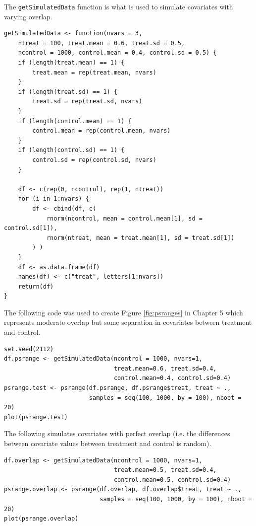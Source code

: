 \begin{singlespace}

\noindent The \texttt{getSimulatedData} function is what is used to simulate covariates with varying overlap.

\begin{verbatim}
getSimulatedData <- function(nvars = 3, 
    ntreat = 100, treat.mean = 0.6, treat.sd = 0.5, 
    ncontrol = 1000, control.mean = 0.4, control.sd = 0.5) {
    if (length(treat.mean) == 1) {
        treat.mean = rep(treat.mean, nvars)
    }
    if (length(treat.sd) == 1) {
        treat.sd = rep(treat.sd, nvars)
    }
    if (length(control.mean) == 1) {
        control.mean = rep(control.mean, nvars)
    }
    if (length(control.sd) == 1) {
        control.sd = rep(control.sd, nvars)
    }
    
    df <- c(rep(0, ncontrol), rep(1, ntreat))
    for (i in 1:nvars) {
        df <- cbind(df, c(
            rnorm(ncontrol, mean = control.mean[1], sd = control.sd[1]), 
            rnorm(ntreat, mean = treat.mean[1], sd = treat.sd[1])
        ) )
    }
    df <- as.data.frame(df)
    names(df) <- c("treat", letters[1:nvars])
    return(df)
}
\end{verbatim}

\noindent The following code was used to create Figure \ref{fig:psranges} in Chapter 5 which represents moderate overlap but some separation in covariates between treatment and control.


\begin{verbatim}
set.seed(2112)
df.psrange <- getSimulatedData(ncontrol = 1000, nvars=1,
                               treat.mean=0.6, treat.sd=0.4,
                               control.mean=0.4, control.sd=0.4)
psrange.test <- psrange(df.psrange, df.psrange$treat, treat ~ ., 
                        samples = seq(100, 1000, by = 100), nboot = 20)
plot(psrange.test)
\end{verbatim}

\noindent The following simulates covariates with perfect overlap (i.e. the differences between covariate values between treatment and control is random).

\begin{verbatim}
df.overlap <- getSimulatedData(ncontrol = 1000, nvars=1,
                               treat.mean=0.5, treat.sd=0.4,
                               control.mean=0.5, control.sd=0.4)
psrange.overlap <- psrange(df.overlap, df.overlap$treat, treat ~ ., 
                           samples = seq(100, 1000, by = 100), nboot = 20)
plot(psrange.overlap)
\end{verbatim}


\end{singlespace}
